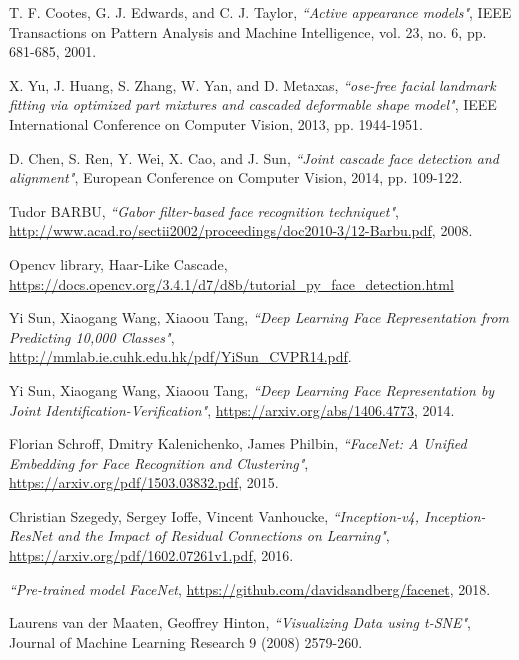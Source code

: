 T. F. Cootes, G. J. Edwards, and C. J. Taylor,
\textit{``Active appearance models"}, IEEE Transactions on Pattern Analysis and Machine Intelligence, vol. 23, no. 6, pp. 681-685, 2001.

X. Yu, J. Huang, S. Zhang, W. Yan, and D. Metaxas,
\textit{``ose-free facial landmark fitting via optimized part mixtures and cascaded deformable
shape model"}, IEEE International Conference on Computer Vision, 2013, pp. 1944-1951.

D. Chen, S. Ren, Y. Wei, X. Cao, and J. Sun,
\textit{``Joint cascade face detection and alignment"}, European Conference on Computer Vision, 2014, pp. 109-122.

Tudor BARBU,
\textit{``Gabor filter-based face recognition techniquet"}, \url{http://www.acad.ro/sectii2002/proceedings/doc2010-3/12-Barbu.pdf}, 2008.

Opencv library, Haar-Like Cascade, \url{https://docs.opencv.org/3.4.1/d7/d8b/tutorial_py_face_detection.html}

Yi Sun, Xiaogang Wang, Xiaoou Tang,
\textit{``Deep Learning Face Representation from Predicting 10,000 Classes"},  \url{http://mmlab.ie.cuhk.edu.hk/pdf/YiSun_CVPR14.pdf}.

Yi Sun, Xiaogang Wang, Xiaoou Tang,
\textit{``Deep Learning Face Representation by Joint Identification-Verification"},  \url {https://arxiv.org/abs/1406.4773}, 2014.

Florian Schroff, Dmitry Kalenichenko, James Philbin,
\textit{``FaceNet: A Unified Embedding for Face Recognition and Clustering"},  \url{https://arxiv.org/pdf/1503.03832.pdf}, 2015. 

Christian Szegedy, Sergey Ioffe, Vincent Vanhoucke,
\textit{``Inception-v4, Inception-ResNet and the Impact of Residual Connections on Learning"},  \url{https://arxiv.org/pdf/1602.07261v1.pdf}, 2016. 

\textit{``Pre-trained model FaceNet},  \url{https://github.com/davidsandberg/facenet}, 2018.

Laurens van der Maaten, Geoffrey Hinton,
\textit{``Visualizing Data using t-SNE"}, Journal of Machine Learning Research 9 (2008) 2579-260.
